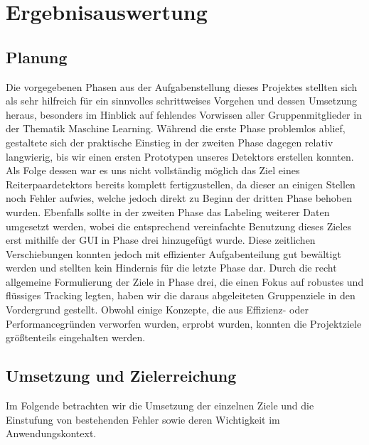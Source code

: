 \chapter{Ergebnisauswertung}
\label{ch:ergebnis}


\section{Planung}
Die vorgegebenen Phasen aus der Aufgabenstellung dieses Projektes stellten sich als sehr hilfreich für ein sinnvolles schrittweises Vorgehen und dessen Umsetzung heraus, besonders im Hinblick auf fehlendes Vorwissen aller Gruppenmitglieder in der Thematik Maschine Learning. Während die erste Phase problemlos ablief, gestaltete sich der praktische Einstieg in der zweiten Phase dagegen relativ langwierig, bis wir einen ersten Prototypen unseres Detektors erstellen konnten. Als Folge dessen war es uns nicht vollständig möglich das Ziel eines Reiterpaardetektors bereits komplett fertigzustellen, da dieser an einigen Stellen noch Fehler aufwies, welche jedoch direkt zu Beginn der dritten Phase behoben wurden. Ebenfalls sollte in der zweiten Phase das Labeling weiterer Daten umgesetzt werden, wobei die entsprechend vereinfachte Benutzung dieses Zieles erst mithilfe der GUI in Phase drei hinzugefügt wurde. Diese zeitlichen Verschiebungen konnten jedoch mit effizienter Aufgabenteilung gut bewältigt werden und stellten kein Hindernis für die letzte Phase dar.
Durch die recht allgemeine Formulierung der Ziele in Phase drei, die einen Fokus auf robustes und flüssiges Tracking legten, haben wir die daraus abgeleiteten Gruppenziele in den Vordergrund gestellt. Obwohl einige Konzepte, die aus Effizienz- oder Performancegründen verworfen wurden, erprobt wurden, konnten die Projektziele größtenteils eingehalten werden. 

\section{Umsetzung und Zielerreichung}
Im Folgende betrachten wir die Umsetzung der einzelnen Ziele und die Einstufung von bestehenden Fehler sowie deren Wichtigkeit im Anwendungskontext.



